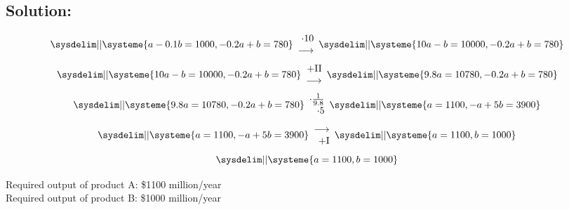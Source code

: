 \documentclass{article}
\begin{document}
\subsection*{Solution:}
\begin{equation}
    \sysdelim||\systeme{
        a - 0.1b = 1000,
        -0.2a + b = 780
    }
    \begin{array}{rr}
        \cdot 10\\
        \longrightarrow \\
    \end{array}
    \sysdelim||\systeme{
        10a - b = 10000,
        -0.2a + b = 780
    }
\end{equation}
\begin{equation}
    \sysdelim||\systeme{
        10a - b = 10000,
        -0.2a + b = 780
    }
    \begin{array}{rr}
        + $II$\\
        \longrightarrow \\
    \end{array}
    \sysdelim||\systeme{
        9.8a = 10780,
        -0.2a + b = 780
    }
\end{equation}
\begin{equation}
    \sysdelim||\systeme{
        9.8a = 10780,
        -0.2a + b = 780
    }
    \begin{array}{rr}
        \cdot \frac{1}{9.8}\\
        \cdot 5\\
    \end{array}
    \sysdelim||\systeme{
        a = 1100,
        -a + 5b = 3900
    }
\end{equation}
\begin{equation}
    \sysdelim||\systeme{
        a = 1100,
        -a + 5b = 3900
    }
    \begin{array}{rr}
        \longrightarrow \\
        +$I$\\
    \end{array}
    \sysdelim||\systeme{
        a = 1100,
        b = 1000
    }
\end{equation}
\begin{equation}
    \sysdelim||\systeme{
        a = 1100,
        b = 1000
    }
\end{equation}
\begin{center}Required output of product A: \$1100 million/year\\
Required output of product B: \$1000 million/year \end{center}
\end{document}
